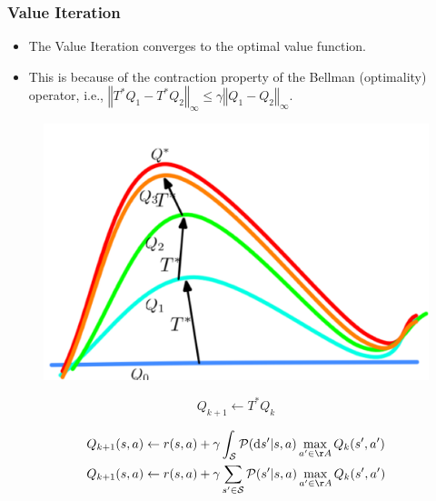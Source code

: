 \documentclass[handout]{beamer}
\newcommand{\Topt}{{T^*}}
\newcommand{\States}{\mathcal{S}}
\newcommand{\PKernel}{\mathcal{P}}
\newcommand{\ds}{\mathrm{d}s}
\newcommand{\norm}[1]{\left\Vert#1\right\Vert}
\begin{document}
\begin{frame}\frametitle{Value Iteration}\small
\begin{itemize}
	\item The Value Iteration converges to the optimal value function.
	\item This is because of the contraction property of the Bellman (optimality) operator, i.e., $\norm{\Topt Q_1 - \Topt Q_2}_\infty \leq \gamma \norm{Q_1 - Q_2}_\infty$.
\end{itemize}
	\begin{figure}
		\includegraphics[width=0.4\linewidth]{Figures/VI_Convergence} 
		\vspace{-0.2in}
	\end{figure}
\[
	Q_{k+1} \leftarrow \Topt Q_k
\]


\begin{align*}
	&
	Q_{k+1}(s,a) \leftarrow r(s,a) + \gamma \int_{\States} \PKernel(\ds' | s,a) \max_{a' \in \AA} Q_k(s',a')
	\\
	& Q_{k+1}(s,a) \leftarrow r(s,a) + \gamma \sum_{s' \in \States} \PKernel(s' | s,a) \max_{a' \in \AA} Q_k(s',a')
\end{align*}



\end{frame}
\end{document}

